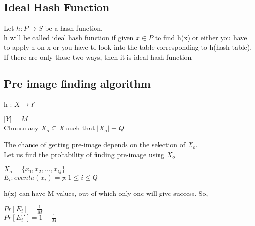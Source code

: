 \documentclass[11pt]{article}
\begin{document}
\subsection{Ideal Hash Function}
Let $h : P \rightarrow S$ be a hash function.\\
h will be called ideal hash function if given $x \in P$ to find h(x) or either you have to apply h on x or you have to look into the table corresponding to h(hash table). If there are only these two ways, then it is ideal hash function.

\subsection{Pre image finding algorithm}
\begin{center}
    h : $X \rightarrow Y$
\end{center}
$|Y|=M$\\
Choose any $X_o \subseteq X$ such that $|X_o| = Q$\\
\begin{center}


\end{center}
The chance of getting pre-image depends on the selection of $X_o$. \\
\newline
Let us find the probability of finding pre-image using $X_o$\\
\begin{center}
    $X_o = \{x_1, x_2, \dots , x_Q \}$\\
    $E_i : event h(x_i) = y; 1 \leq i \leq Q$
\end{center}
h(x) can have M values, out of which only one will give success. So,
\begin{center}
    $Pr[E_i] = \frac{1}{M}$\\
    $Pr[{E_i}'] = 1- \frac{1}{M}$
\end{center}
\end{document}
